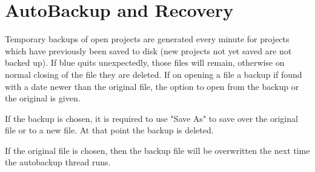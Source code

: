 \section{AutoBackup and Recovery}\label{autoBackup}

Temporary backups of open projects are generated every minute for
projects which have previously been saved to disk (new projects not yet
saved are not backed up). If blue quits unexpectedly, those files will
remain, otherwise on normal closing of the file they are deleted. If on
opening a file a backup if found with a date newer than the original
file, the option to open from the backup or the original is given.

If the backup is chosen, it is required to use "Save As" to save over
the original file or to a new file. At that point the backup is deleted.

If the original file is chosen, then the backup file will be overwritten
the next time the autobackup thread runs.
